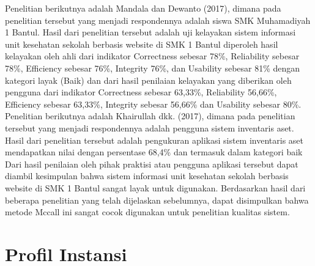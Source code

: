 Penelitian berikutnya adalah  Mandala dan Dewanto (2017), dimana pada penelitian tersebut yang menjadi respondennya adalah siswa SMK Muhamadiyah 1 Bantul. Hasil dari penelitian tersebut adalah uji kelayakan sistem informasi unit kesehatan sekolah berbasis website di SMK 1 Bantul diperoleh hasil kelayakan oleh ahli dari indikator Correctness sebesar 78\%, Reliability sebesar 78\%, Efficiency sebesar 76\%, Integrity 76\%, dan Usability sebesar 81\% dengan kategori layak (Baik) dan dari hasil penilaian kelayakan yang diberikan oleh pengguna dari indikator Correctness sebesar 63,33\%, Reliability 56,66\%, Efficiency sebesar 63,33\%, Integrity sebesar 56,66\% dan Usability sebesar 80\%. Penelitian berikutnya adalah Khairullah dkk. (2017), dimana pada penelitian tersebut yang menjadi respondennya adalah pengguna sistem inventaris aset. Hasil dari penelitian tersebut adalah pengukuran aplikasi sistem inventaris aset mendapatkan nilai dengan persentase 68,4\% dan termasuk dalam kategori baik Dari hasil penilaian oleh pihak praktisi atau pengguna aplikasi tersebut dapat diambil kesimpulan bahwa sistem informasi unit kesehatan sekolah berbasis website di SMK 1 Bantul sangat layak untuk digunakan. Berdasarkan hasil dari beberapa penelitian yang telah dijelaskan sebelumnya, dapat disimpulkan bahwa metode Mccall ini sangat cocok digunakan untuk penelitian kualitas sistem.




\section{Profil Instansi}
